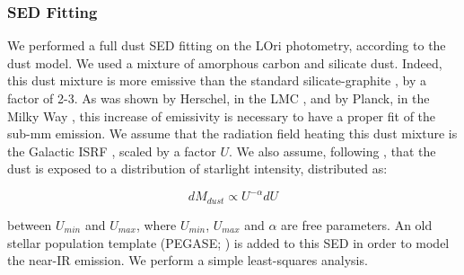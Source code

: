 \subsubsection{SED Fitting}

We performed a full dust SED fitting on the LOri photometry, according to the \cite{galliano11} dust model. We used a mixture of amorphous carbon and silicate dust. Indeed, this dust mixture is more emissive than the standard silicate-graphite \citep{draine07}, by a factor of 2-3. As was shown by Herschel, in the LMC \citep{galliano11}, and by Planck, in the Milky Way \citep{planck16}, this increase of emissivity is necessary to have a proper fit of the sub-mm emission. We assume that the radiation field heating this dust mixture is the Galactic ISRF \citep{math83}, scaled by a factor $U$. We also assume, following \cite{dale01}, that the dust is exposed to a distribution of starlight intensity, distributed as:

\begin{equation}
   \label{eq:U}
     dM_{dust}\propto{} U^{-\alpha}dU
\end{equation}

between $U_{min}$ and $U_{max}$, where $U_{min}$, $U_{max}$ and $\alpha{}$ are free parameters. An old stellar population template (PEGASE; \citep{fioc97}) is added to this SED in order to model the near-IR emission. We perform a simple least-squares analysis.
